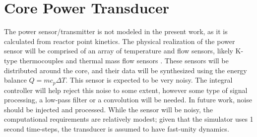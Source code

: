 \section{Core Power Transducer}
The power sensor/transmitter is not modeled in the present work, as it is calculated from reactor point kinetics. The physical realization of the power sensor will be comprised of an array of temperature and flow sensors, likely K-type thermocouples and thermal mass flow sensors \cite{Instrumentation}. These sensors will be distributed around the core, and their data will be synthesized using the energy balance $Q = mc_p\Delta T$. This sensor is expected to be very noisy. The integral controller will help reject this noise to some extent, however some type of signal processing, \eg a low-pass filter or a convolution will be needed. In future work, noise should be injected and processed. While the sensor will be noisy, the computational requirements are relatively modest; given that the simulator uses 1 second time-steps, the transducer is assumed to have fast-unity dynamics.


